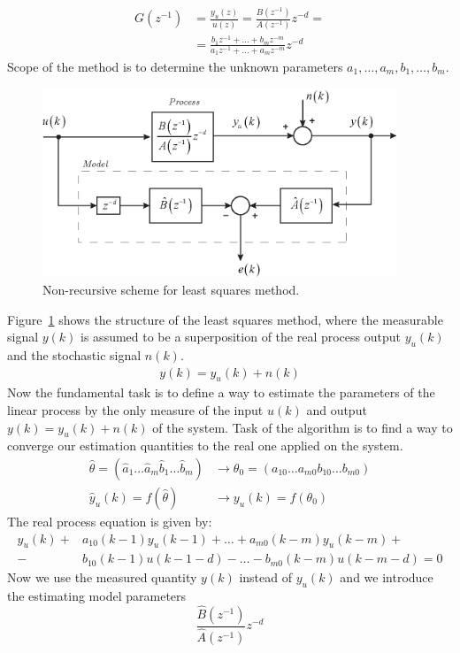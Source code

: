 \documentclass[11pt,a4paper,oneside]{book}
\numberwithin{equation}{section}
\theoremstyle{it}
\theoremstyle{definition}
\begin{document}
\begin{equation}\label{eq:3}
	\begin{aligned}
		G(z^{-1}) & = \frac{y_u(z)}{u(z)}=\frac{B(z^{-1})}{A(z^{-1})}z^{-d}= 
		\\[6pt]
		& = \frac{b_1 z^{-1}+\dots+b_m z^{-m}}{a_1 z^{-1}+\dots+a_m 
		z^{-m}}z^{-d}
	\end{aligned}
\end{equation}
Scope of the method is to determine the unknown parameters 
$a_1,\dots,a_m,b_1,\dots,b_m$.
\begin{figure}[ht]
	\centering
	\includegraphics[width = 300pt, 
	keepaspectratio]{figures/least_square/non_recursive_parm_est_1.eps}
	\captionsetup{width=0.5\textwidth, font=small}		
	\caption{Non-recursive scheme for least squares method.}
	\label{figure_nrs} 
\end{figure} 
Figure~\ref{figure_nrs} shows the structure of the least squares method, where 
the measurable signal $y(k)$ is assumed to be a superposition of the real 
process output $y_u(k)$ and the stochastic signal $n(k)$.
\begin{equation}\label{eq:4}
	\begin{aligned}
		y(k)=y_u(k)+n(k)
	\end{aligned}
\end{equation}
Now the fundamental task is to define a way to estimate the parameters of the 
linear process by the only measure of the input $u(k)$ and output 
$y(k)=y_u(k)+n(k)$ of the system.
Task of the algorithm is to find a way to converge our estimation quantities to 
the real one applied on the system.
\begin{equation*}
	\begin{aligned}
		\hat{\theta}=(\hat{a}_1 \dots \hat{a}_m \hat{b}_1 \dots \hat{b}_m) & 
		\rightarrow \theta_0 = (a_{10} \dots a_{m0} b_{10} \dots b_{m0}) \\
		\hat{y}_u(k) = f(\hat{\theta}) & \rightarrow y_u(k)=f(\theta_0)
	\end{aligned}
\end{equation*}
The real process equation is given by:
\begin{equation}\label{eq:5}
	\begin{aligned}
		y_u(k)+ & a_{10}(k-1)y_u(k-1)+\dots+a_{m0}(k-m)y_u(k-m)+ \\[6pt]
		-&b_{10}(k-1)u(k-1-d)-\dots-b_{m0}(k-m)u(k-m-d)=0
	\end{aligned}
\end{equation}
Now we use the measured quantity $y(k)$ instead of $y_u(k)$ and we introduce 
the estimating model parameters 
$$\boxed{\frac{\hat{B}(z^{-1})}{\hat{A}(z^{-1})}z^{-d}}$$
\end{document}
